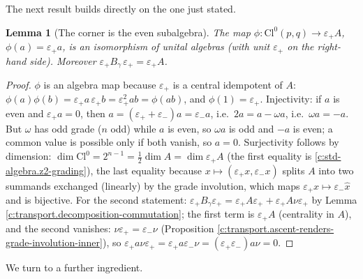 \documentclass[11pt]{article}
\newtheorem{lemma}[theorem]{Lemma}
\theoremstyle{definition}
\theoremstyle{plain}
\providecommand{\Cl}{}\renewcommand{\Cl}{\mathrm{Cl}}
\begin{document}
The next result builds directly on the one just stated.

\begin{lemma}[The corner is the even subalgebra]\label{c:transport.corner-even-subalgebra}
The map $\phi : \Cl^0(p,q) \to \varepsilon_+ A$, $\phi(a) = \varepsilon_+ a$, is an isomorphism of unital algebras (with unit $\varepsilon_+$ on the right-hand side). Moreover $\varepsilon_+ B_\gamma\, \varepsilon_+ = \varepsilon_+ A$.
\end{lemma}
\begin{proof}
$\phi$ is an algebra map because $\varepsilon_+$ is a central idempotent of $A$: $\phi(a)\phi(b) = \varepsilon_+ a\, \varepsilon_+ b = \varepsilon_+^2 ab = \phi(ab)$, and $\phi(1) = \varepsilon_+$. Injectivity: if $a$ is even and $\varepsilon_+ a = 0$, then $a = (\varepsilon_+ + \varepsilon_-)a = \varepsilon_- a$, i.e.\ $2a = a - \omega a$, i.e.\ $\omega a = -a$. But $\omega$ has odd grade ($n$ odd) while $a$ is even, so $\omega a$ is odd and $-a$ is even; a common value is possible only if both vanish, so $a = 0$. Surjectivity follows by dimension: $\dim \Cl^0 = 2^{n-1} = \tfrac12 \dim A = \dim \varepsilon_+ A$ (the first equality is \ref{c:std-algebra.z2-grading}), the last equality because $x \mapsto (\varepsilon_+ x, \varepsilon_- x)$ splits $A$ into two summands exchanged (linearly) by the grade involution, which maps $\varepsilon_+ x \mapsto \varepsilon_- \hat{x}$ and is bijective. For the second statement: $\varepsilon_+ B_\gamma \varepsilon_+ = \varepsilon_+ A \varepsilon_+ + \varepsilon_+ A \nu \varepsilon_+$ by Lemma \ref{c:transport.decomposition-commutation}; the first term is $\varepsilon_+ A$ (centrality in $A$), and the second vanishes: $\nu \varepsilon_+ = \varepsilon_- \nu$ (Proposition \ref{c:transport.ascent-renders-grade-involution-inner}), so $\varepsilon_+ a \nu \varepsilon_+ = \varepsilon_+ a \varepsilon_- \nu = (\varepsilon_+ \varepsilon_-) a \nu = 0$.

\end{proof}

We turn to a further ingredient.
\end{document}
